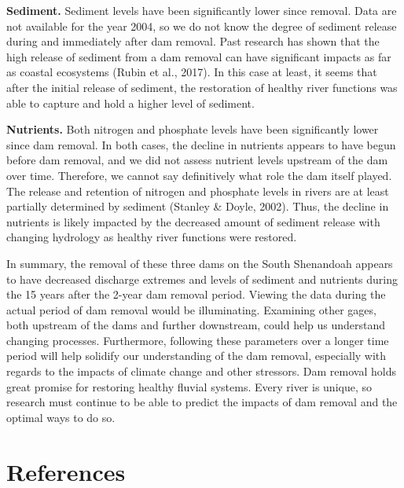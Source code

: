 \documentclass[
  12pt,
]{article}
\begin{document}
\textbf{Sediment.} Sediment levels have been significantly lower since
removal. Data are not available for the year 2004, so we do not know the
degree of sediment release during and immediately after dam removal.
Past research has shown that the high release of sediment from a dam
removal can have significant impacts as far as coastal ecosystems (Rubin
et al., 2017). In this case at least, it seems that after the initial
release of sediment, the restoration of healthy river functions was able
to capture and hold a higher level of sediment.

\textbf{Nutrients.} Both nitrogen and phosphate levels have been
significantly lower since dam removal. In both cases, the decline in
nutrients appears to have begun before dam removal, and we did not
assess nutrient levels upstream of the dam over time. Therefore, we
cannot say definitively what role the dam itself played. The release and
retention of nitrogen and phosphate levels in rivers are at least
partially determined by sediment (Stanley \& Doyle, 2002). Thus, the
decline in nutrients is likely impacted by the decreased amount of
sediment release with changing hydrology as healthy river functions were
restored.

In summary, the removal of these three dams on the South Shenandoah
appears to have decreased discharge extremes and levels of sediment and
nutrients during the 15 years after the 2-year dam removal period.
Viewing the data during the actual period of dam removal would be
illuminating. Examining other gages, both upstream of the dams and
further downstream, could help us understand changing processes.
Furthermore, following these parameters over a longer time period will
help solidify our understanding of the dam removal, especially with
regards to the impacts of climate change and other stressors. Dam
removal holds great promise for restoring healthy fluvial systems. Every
river is unique, so research must continue to be able to predict the
impacts of dam removal and the optimal ways to do so.

\newpage

\hypertarget{references}{%
\section{References}\label{references}}
\end{document}
